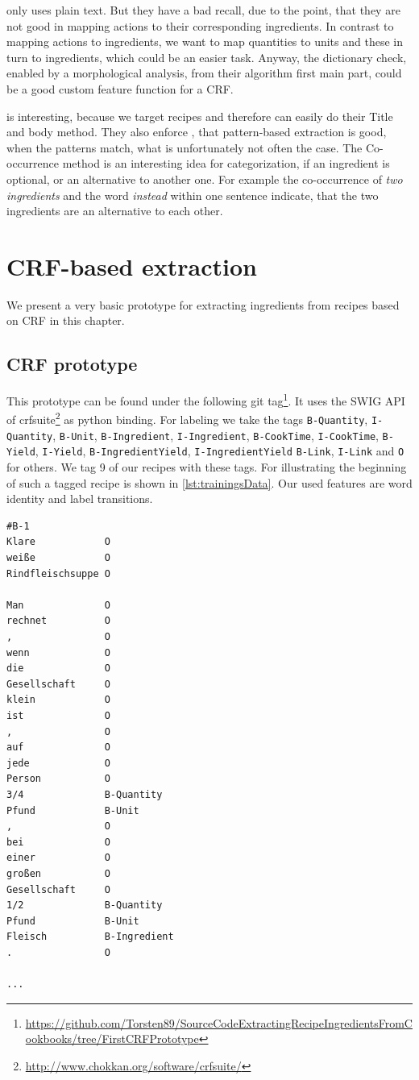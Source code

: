 \documentclass[12pt, twoside]{report}
\begin{document}
\parencite{GrammaBased} only uses plain text. But they have a bad recall, due to the point, that they are not good in mapping actions to their corresponding ingredients. In contrast to mapping actions to ingredients, we want to map quantities to units and these in turn to ingredients, which could be an easier task. Anyway, the dictionary check, enabled by a morphological analysis, from their algorithm first main part, could be a good  custom feature function for a CRF.

\parencite{konvens07_wiegand12o} is interesting, because we target recipes and therefore can easily do their Title and body method. They also enforce \parencite{GrammaBased}, that pattern-based extraction is good, when the patterns match, what is unfortunately not often the case. The Co-occurrence method is an interesting idea for categorization, if an ingredient is optional, or an alternative to another one. For example the co-occurrence of \textit{two ingredients} and the word \textit{instead} within one sentence indicate, that the two ingredients are an alternative to each other.



\chapter{CRF-based extraction}
We present a very basic prototype for extracting ingredients from recipes based on CRF in this chapter.

\section{CRF prototype}
This prototype can be found under the following git tag\footnote{\url{https://github.com/Torsten89/SourceCodeExtractingRecipeIngredientsFromCookbooks/tree/FirstCRFPrototype}}. It uses the SWIG API of crfsuite\footnote{\url{http://www.chokkan.org/software/crfsuite/}} as python binding. For labeling we take the tags \texttt{B-Quantity}, \texttt{I-Quantity}, \texttt{B-Unit}, \texttt{B-Ingredient}, \texttt{I-Ingredient}, \texttt{B-CookTime}, \texttt{I-CookTime},
\texttt{B-Yield}, \texttt{I-Yield}, \texttt{B-IngredientYield}, \texttt{I-IngredientYield}
\texttt{B-Link}, \texttt{I-Link} and \texttt{O} for others. We tag 9 of our recipes with these tags. For illustrating the beginning of such a tagged recipe is shown in \cref{lst:trainingsData}. Our used features are word identity and label transitions.

\begin{lstlisting}[caption={Trainings data}, label=lst:trainingsData]
#B-1
Klare            O
weiße            O
Rindfleischsuppe O

Man	             O
rechnet	         O
,                O
wenn             O
die	             O
Gesellschaft     O
klein            O
ist              O
,                O
auf              O
jede             O
Person           O
3/4	             B-Quantity
Pfund            B-Unit
,                O
bei              O
einer            O
großen           O
Gesellschaft     O
1/2	             B-Quantity
Pfund            B-Unit
Fleisch          B-Ingredient
.                O

...
\end{lstlisting}
\end{document}
